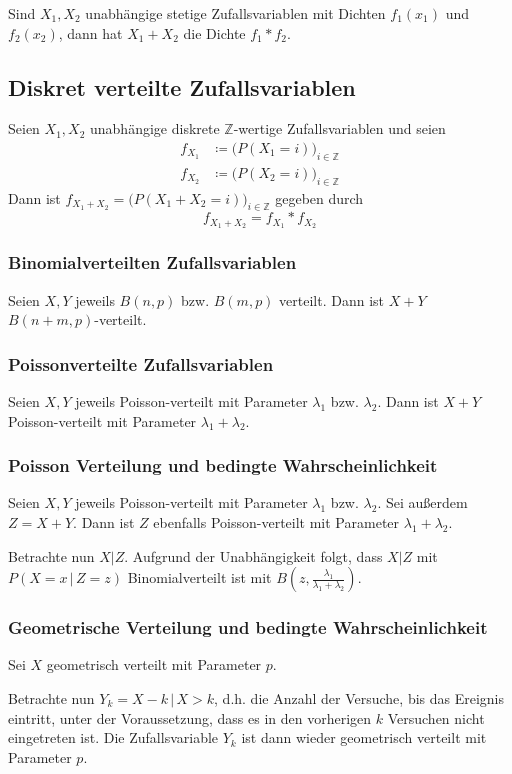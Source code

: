             Sind \( X_1, X_2 \) unabhängige stetige Zufallsvariablen mit Dichten \( f_1(x_1) \) und \( f_2(x_2) \), dann hat \( X_1 + X_2 \) die Dichte \( f_1 \ast f_2 \).
            
		\subsection{Diskret verteilte Zufallsvariablen}
			Seien \( X_1, X_2 \) unabhängige diskrete \( \mathbb{Z} \)-wertige Zufallsvariablen und seien
			\begin{align*}
				f_{X_1} & \coloneqq \big( P(X_1 = i) \big) _ { i \in \mathbb{Z} } \\
				f_{X_2} & \coloneqq \big( P(X_2 = i) \big) _ { i \in \mathbb{Z} }
			\end{align*}
			Dann ist \( f_{X_1 + X_2} = \big( P(X_1 + X_2 = i) \big)_{i \in \mathbb{Z}} \) gegeben durch
			\begin{equation*}
				f_{X_1 + X_2} = f_{X_1} \ast f_{X_2}
			\end{equation*}
			
			\subsubsection{Binomialverteilten Zufallsvariablen}
				Seien \(X, Y\) jeweils \( B(n, p) \) bzw. \( B(m, p) \) verteilt. Dann ist \( X + Y \) \( B(n + m, p) \)-verteilt.
			
			\subsubsection{Poissonverteilte Zufallsvariablen}
				Seien \(X, Y\) jeweils Poisson-verteilt mit Parameter \( \lambda_1 \) bzw. \( \lambda_2 \). Dann ist \( X + Y \) Poisson-verteilt mit Parameter \( \lambda_1 + \lambda_2 \).
			
			\subsubsection{Poisson Verteilung und bedingte Wahrscheinlichkeit}
				Seien \(X, Y\) jeweils Poisson-verteilt mit Parameter \( \lambda_1 \) bzw. \( \lambda_2 \). Sei außerdem \( Z = X + Y \). Dann ist \(Z\) ebenfalls Poisson-verteilt mit Parameter \( \lambda_1 + \lambda_2 \).
			
				Betrachte nun \( X \vert Z \).  Aufgrund der Unabhängigkeit folgt, dass \( X \vert Z \) mit \( P(X = x \,\vert\, Z = z) \) Binomialverteilt ist mit \( B(z, \frac{\lambda_1}{\lambda_1 + \lambda_2}) \).
			
			\subsubsection{Geometrische Verteilung und bedingte Wahrscheinlichkeit}
				Sei \( X \) geometrisch verteilt mit Parameter \(p\).
			
				Betrachte nun \( Y_k = X - k \,\vert\, X > k \), d.h. die Anzahl der Versuche, bis das Ereignis eintritt, unter der Voraussetzung, dass es in den vorherigen \(k\) Versuchen nicht eingetreten ist. Die Zufallsvariable \(Y_k\) ist dann wieder geometrisch verteilt mit Parameter \(p\).
